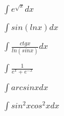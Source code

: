 \documentclass{article}
\begin{document}
$
\int e^{\sqrt{x}}dx
$

$
\int sin(lnx)dx
$

$
\int \frac{ctgx}{ln(sinx)}dx
$

$
\int \frac{1}{e^x+e^{-x}}
$

$
\int arcsinx dx
$

$
\int sin^2 xcos^2 xdx
$
\end{document}
